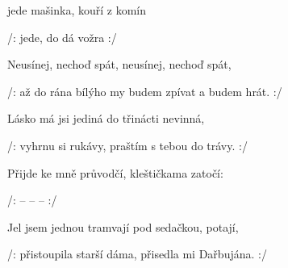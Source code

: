 

\zr
{} jede mašinka, kouří  z komín

/: jede,  do dá  vožra :/
\kr

\zs
Neusínej, nechoď spát, neusínej, nechoď spát,

/: až do rána bílýho my budem zpívat a budem hrát. :/
\ks

\zs
Lásko má jsi jediná do třinácti nevinná,

/: vyhrnu si rukávy, praštím s tebou do trávy. :/
\ks

\zr  \kr

\zs
Přijde ke mně průvodčí, kleštičkama zatočí:

/:  --  --  -- 
 :/
\ks

\zr  \kr

\zs
Jel jsem jednou tramvají pod sedačkou, potají,

/: přistoupila starší dáma, přisedla mi Dařbujána. :/
\ks

\zr  \kr

\kp






















